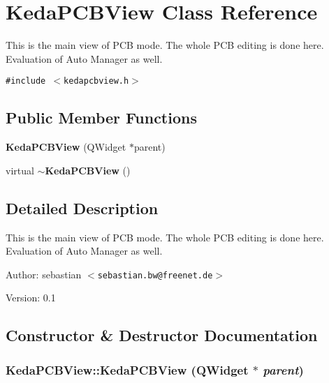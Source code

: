 \section{Keda\-PCBView Class Reference}
\label{classKedaPCBView}
This is the main view of PCB mode. The whole PCB editing is done here. Evaluation of Auto Manager as well.  


{\tt \#include $<$kedapcbview.h$>$}

\subsection*{Public Member Functions}
\begin{CompactItemize}
\item 
{\bf Keda\-PCBView} (QWidget $\ast$parent)
\item 
virtual {\bf $\sim$Keda\-PCBView} ()
\end{CompactItemize}


\subsection{Detailed Description}
This is the main view of PCB mode. The whole PCB editing is done here. Evaluation of Auto Manager as well. 

\begin{Desc}
\item[Author:]sebastian $<${\tt sebastian.bw@freenet.de}$>$ \end{Desc}
\begin{Desc}
\item[Version:]0.1 \end{Desc}




\subsection{Constructor \& Destructor Documentation}
\subsubsection{\setlength{\rightskip}{0pt plus 5cm}Keda\-PCBView::Keda\-PCBView (QWidget $\ast$ {\em parent})}\label{classKedaPCBView_958912152aada28d0b56d97bac066f2c}


